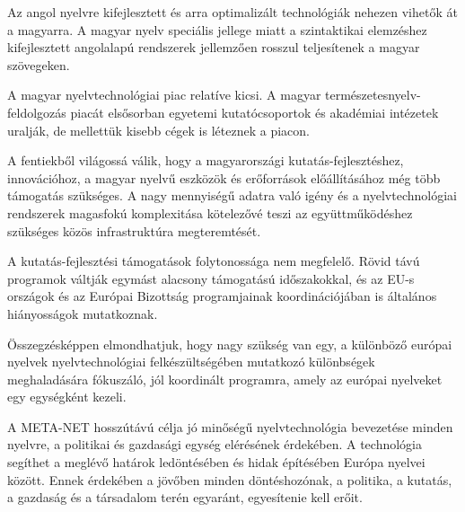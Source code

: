 \begin{multicols}{2}
  Az angol nyelvre kifejlesztett és arra optimalizált technológiák nehezen vihetők át a magyarra. A magyar nyelv speciális jellege miatt a szintaktikai elemzéshez ki\-fej\-lesz\-tett angolalapú rendszerek jellemzően rosszul teljesítenek a magyar szövegeken.    

  A magyar nyelvtechnológiai piac relatíve kicsi. A magyar ter\-mé\-sze\-tes\-nyelv-fel\-dol\-go\-zás piacát elsősorban egyetemi ku\-ta\-tó\-cso\-por\-tok és akadémiai intézetek uralják, de mellettük kisebb cégek is léteznek a piacon.

  A fentiekből világossá válik, hogy a ma\-gyar\-or\-szá\-gi kutatás-fejlesztéshez, innovációhoz, a magyar nyelvű eszközök és erőforrások előállításához még több támogatás szükséges. A nagy mennyiségű adat\-ra való igény és a nyelvtechnológiai rendszerek magasfokú komplexitása kötelezővé teszi az együttműködéshez szükséges közös infrastruktúra megteremtését.

  A kutatás-fejlesztési támogatások foly\-to\-nos\-sá\-ga nem megfelelő. Rövid távú prog\-ra\-mok váltják egymást alacsony támogatású időszakokkal, és az EU-s országok és az Európai Bizottság programjainak koordinációjában is általános hiányosságok mutatkoznak.

  Összegzésképpen el\-mond\-hat\-juk, hogy nagy szükség van egy, a különböző európai nyelvek nyelvtechnológiai fel\-ké\-szült\-sé\-gé\-ben mutatkozó különbségek meg\-ha\-la\-dá\-sá\-ra fókuszáló, jól koordinált programra, amely az európai nyelveket egy egységként kezeli.

  A META-NET hosszútávú célja jó mi\-nő\-sé\-gű nyelvtechnológia bevezetése minden nyelvre, a politikai és gazdasági egység elérésének érdekében. A technológia se\-gít\-het a meglévő határok ledöntésében és hidak építésében Európa nyelvei között. Ennek érdekében a jövőben minden döntéshozónak, a politika, a kutatás, a gazdaság és a társadalom terén egyaránt, egyesítenie kell erőit. 
  \end{multicols}

  \cleardoublepage


  \label{meta-net_hu}

